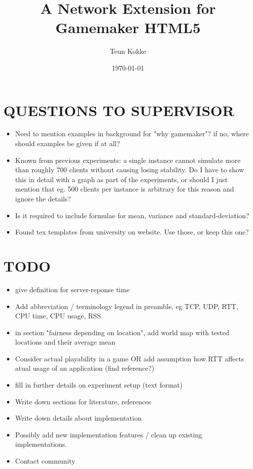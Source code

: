 \documentclass[bsc,frontabs,twoside,singlespacing,parskip,deptreport]{infthesis}     %
\begin{document}
\title{A Network Extension for Gamemaker HTML5}

\author{Teun Kokke}

\date{\today}


\maketitle

\section*{QUESTIONS TO SUPERVISOR}
\begin{itemize}
\item Need to mention examples in background for "why gamemaker"? if no, where should examples be given if at all?
\item Known from previous experiments: a single instance cannot simulate more than roughly 700 clients without causing losing stability. Do I have to show this in detail with a graph as part of the experiments, or should I just mention that eg. 500 clients per instance is arbitrary for this reason and ignore the details?
\item Is it required to include formulae for mean, variance and standard-deviation?
\item Found tex templates from university on website. Use those, or keep this one?
\end{itemize}

\section*{TODO}
\begin{itemize}
\item give definition for server-reponse time
\item Add abbreviation / terminology legend in preamble, eg TCP, UDP, RTT, CPU time, CPU usage, RSS.
\item in section "fairness depending on location", add world map with tested locations and their average mean
\item Consider actual playability in a game OR add assumption how RTT affects atual usage of an application (find reference?)
\item fill in further details on experiment setup (text format)
\item Write down sections for literature, references
\item Write down details about implementation
\item Possibly add new implementation features / clean up existing implementations.
\item Contact community
\end{itemize}
\end{document}
